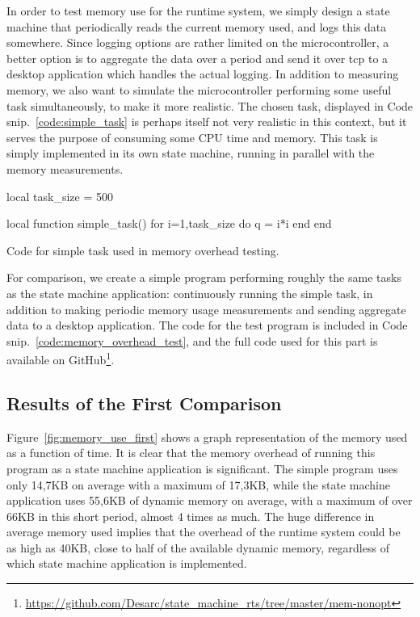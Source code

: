 In order to test memory use for the runtime system, we simply design a state machine that periodically reads the current memory used, and logs this data somewhere. Since logging options are rather limited on the microcontroller, a better option is to aggregate the data over a period and send it over \gls{tcp} to a desktop application which handles the actual logging. In addition to measuring memory, we also want to simulate the microcontroller performing some useful task simultaneously, to make it more realistic. The chosen task, displayed in Code snip.~\ref{code:simple_task} is perhaps itself not very realistic in this context, but it serves the purpose of consuming some CPU time and memory. This task is simply implemented in its own state machine, running in parallel with the memory measurements.

\begin{listing}[htp]
\begin{luacode}
local task_size = 500

local function simple_task()
	for i=1,task_size do
		q = i*i
	end
end
\end{luacode}
	\caption{Code for simple task used in memory overhead testing.}
	\label{code:simple_task}
\end{listing}

For comparison, we create a simple program performing roughly the same tasks as the state machine application: continuously running the simple task, in addition to making periodic memory usage measurements and sending aggregate data to a desktop application. The code for the test program is included in Code snip.~\ref{code:memory_overhead_test}, and the full code used for this part is available on GitHub\footnote{\url{https://github.com/Desarc/state_machine_rts/tree/master/mem-nonopt}}.

\subsection{Results of the First Comparison}
\label{sec:first_comparison}
Figure~\ref{fig:memory_use_first} shows a graph representation of the memory used as a function of time. It is clear that the memory overhead of running this program as a state machine application is significant. The simple program uses only 14,7KB on average with a maximum of 17,3KB, while the state machine application uses 55,6KB of dynamic memory on average, with a maximum of over 66KB in this short period, almost 4 times as much. The huge difference in average memory used implies that the overhead of the runtime system could be as high as 40KB, close to half of the available dynamic memory, regardless of which state machine application is implemented.

